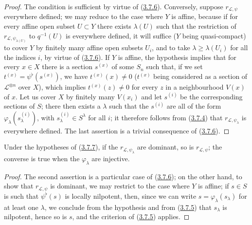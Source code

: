 \begin{proof}
The condition is sufficient by virtue of
(\hyperref[II.3.7.6]{3.7.6}). Conversely, suppose
$r_{\mathcal{L},\psi}$ everywhere defined; we may reduce to the case where $Y$
is affine, because if for every affine open subset $U\subset Y$ there exists
$\lambda(U)$ such that the restriction of $r_{\mathcal{L},\psi_{\lambda(U)}}$
to $q^{-1}(U)$ is everywhere defined, it will suffice ($Y$ being
quasi-compact) to cover $Y$ by finitely many affine open subsets $U_i$, and
to take $\lambda\geq\lambda(U_i)$ for all the indices $i$, by virtue of
(\hyperref[II.3.7.6]{3.7.6}). If $Y$ is affine, the hypothesis implies that
for every $x\in X$ there is a section $s^{(x)}$ of some $S_n$ such that, if
we set $t^{(x)}=\psi^\flat(s^{(x)})$, we have $t^{(x)}(x)\neq0$
($t^{(x)}$ being considered as a section of $\mathcal{L}^{\otimes n}$
over $X$), which implies $t^{(x)}(z)\neq0$ for every $z$ in a
neighbourhood $V(x)$ of $x$. Let us cover $X$ by finitely many $V(x_i)$ and
let $s^{(i)}$ be the corresponding sections of $S$; there then exists a
$\lambda$ such that the $s^{(i)}$ are all of the form
$\varphi_\lambda(s_\lambda^{(i)})$, with $s_\lambda^{(i)}\in S^\lambda$ for
all $i$; it therefore follows from (\hyperref[II.3.7.4]{3.7.4}) that
$r_{\mathcal{L},\psi_\lambda}$ is everywhere defined. The last assertion is a
trivial consequence of (\hyperref[II.3.7.6]{3.7.6}).
\end{proof}

\begin{corollary}[3.7.8]
\label{II.3.7.8}
Under the hypotheses of (\hyperref[II.3.7.7]{3.7.7}), if the
$r_{\mathcal{L},\psi_\lambda}$ are dominant, so is
$r_{\mathcal{L},\psi}$; the converse is true when the
$\varphi_\lambda$ are injective.
\end{corollary}


\begin{proof}
The second assertion is a particular case of
(\hyperref[II.3.7.6]{3.7.6}); on the other hand, to show that
$r_{\mathcal{L},\psi}$ is dominant, we may restrict to the case where $Y$ is
affine; if $s\in S$ is such that $\psi^\flat(s)$ is locally
nilpotent, then, since we can write $s=\varphi_\lambda(s_\lambda)$ for at
least one $\lambda$, we conclude from the hypothesis and from
(\hyperref[II.3.7.5]{3.7.5}) that $s_\lambda$ is nilpotent, hence so is $s$,
and the criterion of (\hyperref[II.3.7.5]{3.7.5}) applies.
\end{proof}

